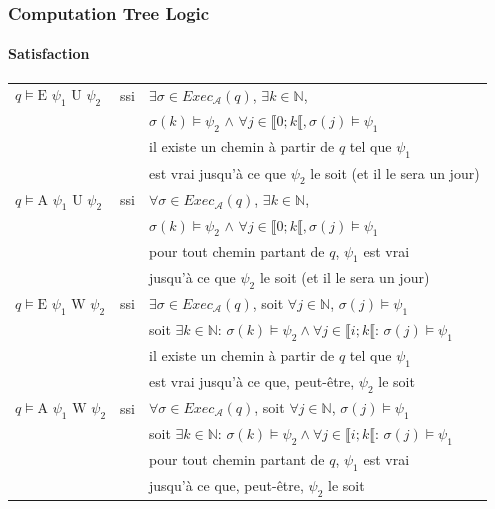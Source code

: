\documentclass[11pt]{beamer}
\begin{document}
\begin{frame}
    \frametitle{Computation Tree Logic}
    \framesubtitle{Satisfaction}

    \footnotesize
    \begin{tabular}{lcl}
    $q \vDash \mbox{E } \psi_1 \mbox{ U } \psi_2$ &ssi&
    $\exists \sigma \in Exec_\mathcal{A}(q)$, $\exists k \in \mathbb{N}$,\\
    &&$\sigma(k)\vDash \psi_2$ $\land$ $\forall j \in \llbracket 0; k\llbracket, \sigma(j)\vDash \psi_1$\\
    && \pause[2] il existe un chemin à partir de $q$ tel que $\psi_1$\\&& est vrai jusqu'à ce que $\psi_2$ le soit (et il le sera un jour) \pause[1]\\

    $q \vDash \mbox{A } \psi_1 \mbox{ U } \psi_2$ &ssi&
    $\forall \sigma \in Exec_\mathcal{A}(q)$, $\exists k \in \mathbb{N}$,\\
    &&$\sigma(k)\vDash \psi_2$ $\land$ $\forall j \in \llbracket 0; k\llbracket, \sigma(j)\vDash \psi_1$\\
    &&\pause[2] pour tout chemin partant de $q$, $\psi_1$ est vrai \\&& jusqu'à ce que $\psi_2$ le soit (et il le sera un jour)\pause[1]\\

    $q \vDash \mbox{E } \psi_1 \mbox{ W } \psi_2$ &ssi&
    $\exists \sigma \in Exec_\mathcal{A}(q)$, soit $\forall j \in \mathbb{N}$, $\sigma(j) \vDash \psi_1$\\
    & & \pause[2]soit $\exists k\in \mathbb{N}$: $\sigma(k)\vDash \psi_2 \land \forall j \in \llbracket i; k \llbracket$: $\sigma(j) \vDash \psi_1$\\
    && il existe un chemin à partir de $q$ tel que $\psi_1$\\&& est vrai jusqu'à ce que, peut-être, $\psi_2$ le soit\pause[1]\\

    $q \vDash \mbox{A } \psi_1 \mbox{ W } \psi_2$ &ssi&
    $\forall \sigma \in Exec_\mathcal{A}(q)$, soit $\forall j \in \mathbb{N}$, $\sigma(j) \vDash \psi_1$\\
    & & \pause[2]soit $\exists k\in \mathbb{N}$: $\sigma(k)\vDash \psi_2 \land \forall j \in \llbracket i; k \llbracket$: $\sigma(j) \vDash \psi_1$\\
    && pour tout chemin partant de $q$, $\psi_1$ est vrai \\&& jusqu'à ce que, peut-être, $\psi_2$ le soit\pause[1]\\
    \end{tabular}

\end{frame}
\end{document}
